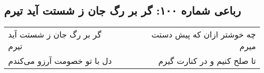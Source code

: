 \begin{center}
\section*{رباعی شماره ۱۰۰: گر بر رگ جان ز شستت آید تیرم}
\label{sec:100}
\begin{longtable}{l p{0.5cm} r}
گر بر رگ جان ز شستت آید تیرم
&&
چه خوشتر ازان که پیش دستت میرم
\\
دل با تو خصومت آرزو می‌کندم
&&
تا صلح کنیم و در کنارت گیرم
\\
\end{longtable}
\end{center}
